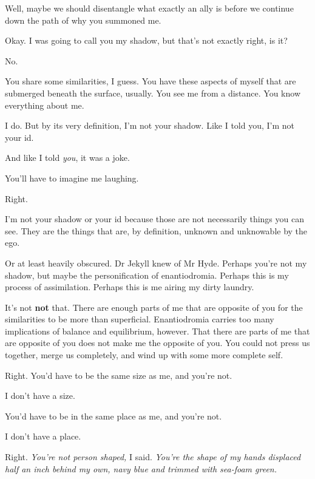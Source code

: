 \begin{ally}
Well, maybe we should disentangle what exactly an ally is before we continue down the path of why you summoned me.
\end{ally}
Okay. I was going to call you my shadow, but that's not exactly right, is it?

\begin{ally}
No.
\end{ally}
You share some similarities, I guess. You have these aspects of myself that are submerged beneath the surface, usually. You see me from a distance. You know everything about me.

\begin{ally}
I do. But by its very definition, I'm not your shadow. Like I told you, I'm not your id.
\end{ally}
And like I told \emph{you}, it was a joke.

\begin{ally}
You'll have to imagine me laughing.
\end{ally}
Right.

\begin{ally}
I'm not your shadow or your id because those are not necessarily things you can see. They are the things that are, by definition, unknown and unknowable by the ego.
\end{ally}
Or at least heavily obscured. Dr Jekyll knew of Mr Hyde. Perhaps you're not my shadow, but maybe the personification of enantiodromia. Perhaps this is my process of assimilation. Perhaps this is me airing my dirty laundry.

\begin{ally}
It's not \textbf{not} that. There are enough parts of me that are opposite of you for the similarities to be more than superficial. Enantiodromia carries too many implications of balance and equilibrium, however. That there are parts of me that are opposite of you does not make me the opposite of you. You could not press us together, merge us completely, and wind up with some more complete self.
\end{ally}
Right. You'd have to be the same size as me, and you're not.

\begin{ally}
I don't have a size.
\end{ally}
You'd have to be in the same place as me, and you're not.

\begin{ally}
I don't have a place.
\end{ally}
Right. \emph{You're not person shaped,} I said. \emph{You're the shape of my hands displaced half an inch behind my own, navy blue and trimmed with sea-foam green.}

